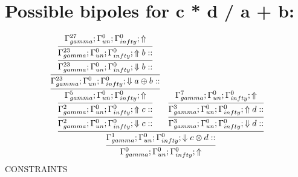 \documentclass[a4paper, 11pt]{article}
\begin{document}
\section{Possible bipoles for c * d / a + b:} 

\[
\infer{\Gamma_{ gamma}^{0} ; \Gamma_{un}^{0} ; \Gamma_{ infty}^{0} ;  \Uparrow }
{\infer{\Gamma_{ gamma}^{1} ; \Gamma_{un}^{0} ; \Gamma_{ infty}^{0} ;  \Downarrow c \otimes d :: }
{\infer{\Gamma_{ gamma}^{2} ; \Gamma_{un}^{0} ; \Gamma_{ infty}^{0} ;  \Downarrow c :: }
{\infer{\Gamma_{ gamma}^{2} ; \Gamma_{un}^{0} ; \Gamma_{ infty}^{0} ;  \Uparrow c :: }
{\infer{\Gamma_{ gamma}^{5} ; \Gamma_{un}^{0} ; \Gamma_{ infty}^{0} ;  \Uparrow }
{\infer{\Gamma_{ gamma}^{23} ; \Gamma_{un}^{0} ; \Gamma_{ infty}^{0} ;  \Downarrow a \oplus b :: }
{\infer{\Gamma_{ gamma}^{23} ; \Gamma_{un}^{0} ; \Gamma_{ infty}^{0} ;  \Downarrow b :: }
{\infer{\Gamma_{ gamma}^{23} ; \Gamma_{un}^{0} ; \Gamma_{ infty}^{0} ;  \Uparrow b :: }
{\Gamma_{ gamma}^{27} ; \Gamma_{un}^{0} ; \Gamma_{ infty}^{0} ;  \Uparrow }}}}}}
&
\infer{\Gamma_{ gamma}^{3} ; \Gamma_{un}^{0} ; \Gamma_{ infty}^{0} ;  \Downarrow d :: }
{\infer{\Gamma_{ gamma}^{3} ; \Gamma_{un}^{0} ; \Gamma_{ infty}^{0} ;  \Uparrow d :: }
{\Gamma_{ gamma}^{7} ; \Gamma_{un}^{0} ; \Gamma_{ infty}^{0} ;  \Uparrow }}}}
\]
CONSTRAINTS
\end{document}
